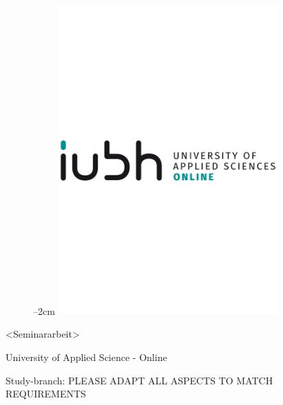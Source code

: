 
\label{titlePage}
\begin{figure}[h]
\centering
\advance\leftskip--2cm
\includegraphics[width=0.75\textwidth]{pics/logo.pdf}
\end{figure}
\FloatBarrier

\begin{Large} 
\begin{center}
<Seminararbeit>
\end{center}
\end{Large} 

\vspace*{5mm}

\begin{large} 
\begin{center}
University of Applied Science - Online
\end{center}
\end{large} 

\begin{large} 
\begin{center}
Study-branch: PLEASE ADAPT ALL ASPECTS TO MATCH REQUIREMENTS
\end{center}
\end{large}

